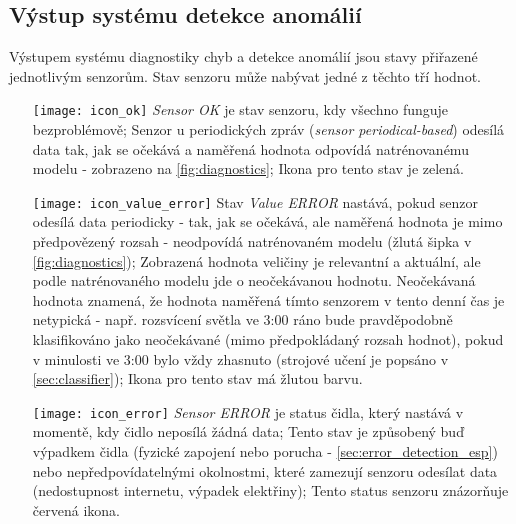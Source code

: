 \subsection*{Výstup systému detekce anomálií} \label{subsec:diagnostics_output}
Výstupem systému diagnostiky chyb a detekce anomálií jsou stavy přiřazené jednotlivým senzorům. Stav senzoru může nabývat jedné z těchto tří hodnot.

\begin{itemize}
  \item [{\texttt{[image: icon\_ok]}}] \textit{Sensor OK} je stav senzoru, kdy všechno funguje bezproblémově; Senzor u periodických zpráv (\textit{sensor periodical-based}) odesílá data tak, jak se očekává a naměřená hodnota odpovídá natrénovanému modelu - zobrazeno na \cref{fig:diagnostics}; Ikona pro tento stav je zelená.
  \item [{\texttt{[image: icon\_value\_error]}}] Stav \textit{Value ERROR} nastává, pokud senzor odesílá data periodicky - tak, jak se očekává, ale naměřená hodnota je mimo předpovězený rozsah - neodpovídá natrénovaném modelu (žlutá šipka v \cref{fig:diagnostics}); Zobrazená hodnota veličiny je relevantní a aktuální, ale podle natrénovaného modelu jde o neočekávanou hodnotu. Neočekávaná hodnota znamená, že  hodnota naměřená tímto senzorem v tento denní čas je netypická - např. rozsvícení světla ve 3:00 ráno bude pravděpodobně klasifikováno jako neočekávané (mimo předpokládaný rozsah hodnot), pokud v minulosti ve 3:00 bylo vždy zhasnuto (strojové učení je popsáno v \cref{sec:classifier}); Ikona pro tento stav má žlutou barvu.
  \item [{\texttt{[image: icon\_error]}}] \textit{Sensor ERROR} je status čidla, který nastává v momentě, kdy čidlo neposílá žádná data; Tento stav je způsobený buď výpadkem čidla (fyzické zapojení nebo porucha - \cref{sec:error_detection_esp}) nebo nepředpovídatelnými okolnostmi, které zamezují senzoru odesílat data (nedostupnost internetu, výpadek elektřiny); Tento status senzoru znázorňuje červená ikona.
\end{itemize}


